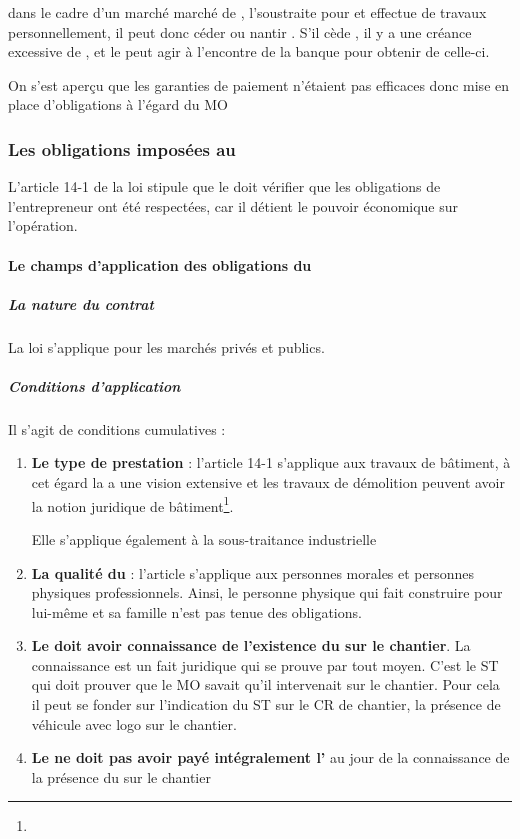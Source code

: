 					\begin{exemple}
						dans le cadre d'un marché marché de , l'\ep soustraite pour  et effectue  de travaux personnellement, il peut donc céder ou nantir . S'il cède  , il y a une créance excessive de ,  et le \ST peut agir à l’encontre de la banque pour obtenir  de celle-ci.
					\end{exemple}

					On s’est aperçu que les garanties de paiement n’étaient pas efficaces donc mise en place d’obligations à l’égard du MO



		\subsubsection{Les obligations imposées au \Mo}

			L'article 14-1 de la loi  \aVerifier stipule que le \Mo doit vérifier que les obligations de l’entrepreneur ont été respectées, car il détient le pouvoir économique sur l’opération.

			\paragraph{Le champs d'application des obligations du \Mo}

				\subparagraph{La nature du contrat} La loi s'applique pour les marchés privés et publics.

				\subparagraph{Conditions d’application }
Il s’agit de conditions cumulatives :
				\begin{enumerate}
					\item \textbf{Le type de prestation} : l'article 14-1 s’applique aux travaux de bâtiment, à cet égard la \CourDeCas a une vision extensive et les travaux de démolition peuvent avoir la notion juridique de bâtiment\footnote{\aVerifier}.


					Elle s’applique également à la sous-traitance industrielle


					\item 	\textbf{La qualité du \MO} : l'article s'applique aux \MO personnes morales et personnes physiques professionnels. Ainsi, le \MO personne physique qui fait construire pour lui-même et sa famille n’est pas tenue des obligations.


					\item 	\textbf{Le \MO doit avoir connaissance de l’existence du \ST sur le chantier}. La connaissance est un fait juridique qui se prouve par tout moyen. C’est le ST qui doit prouver que le MO savait qu’il intervenait sur le chantier. Pour cela il peut se fonder sur l’indication du ST sur le CR de chantier, la présence de véhicule avec logo sur le chantier.

					\item 	\textbf{Le \MO ne doit pas avoir payé intégralement l’\ep} au jour de la connaissance de la présence du \ST sur le chantier

				\end{enumerate}


